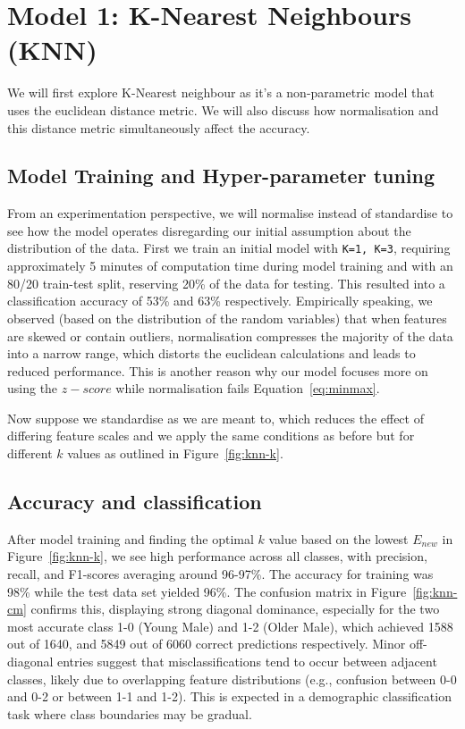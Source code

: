 \documentclass[10pt,twocolumn]{article}
\begin{document}
\section{Model 1: K-Nearest Neighbours (KNN)}
We will first explore K-Nearest neighbour as it's a non-parametric model that uses the euclidean distance metric. We will also discuss how normalisation and this distance metric simultaneously affect the accuracy.
\subsection{Model Training and Hyper-parameter tuning}

From an experimentation perspective, we will normalise instead of standardise to see how the model operates disregarding our initial assumption about the distribution of the data. First we train an initial model with \texttt{K=1, K=3}, requiring approximately 5 minutes of computation time during model training and with an 80/20 train-test split, reserving 20\% of the data for testing. This resulted into a classification accuracy of 53\% and 63\% respectively. Empirically speaking, we observed (based on the distribution of the random variables) that when features are skewed or contain outliers, normalisation compresses the majority of the data into a narrow range, which distorts the euclidean calculations and leads to reduced performance. This is another reason why our model focuses more on using the $z-score$ while normalisation fails Equation~\ref{eq:minmax}.

Now suppose we standardise as we are meant to, which reduces the effect of differing feature scales and we apply the same conditions as before but for different $k$ values as outlined in Figure~\ref{fig:knn-k}.


\subsection{Accuracy and classification}
After model training and finding the optimal $k$ value based on the lowest $E_{new}$ in Figure~\ref{fig:knn-k}, we see high performance across all classes, with precision, recall, and F1-scores averaging around 96-97\%. The accuracy for training was 98\% while the test data set yielded 96\%. The confusion matrix in Figure~\ref{fig:knn-cm} confirms this, displaying strong diagonal dominance, especially for the two most accurate class 1-0 (Young Male) and 1-2 (Older Male), which achieved 1588 out of 1640, and 5849 out of 6060 correct predictions respectively. Minor off-diagonal entries suggest that misclassifications tend to occur between adjacent classes, likely due to overlapping feature distributions (e.g., confusion between 0-0 and 0-2 or between 1-1 and 1-2). This is expected in a demographic classification task where class boundaries may be gradual. 
\end{document}

